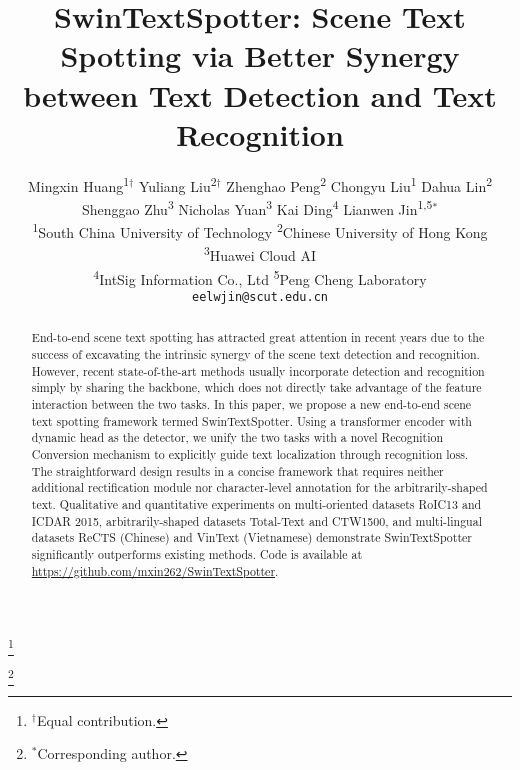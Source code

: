\documentclass[10pt,twocolumn,letterpaper]{article}
\newcommand\blfootnote[1]{\begingroup
\renewcommand\thefootnote{}\footnote{#1}\addtocounter{footnote}{-1}\endgroup
}
\begin{document}
\title{
SwinTextSpotter: Scene Text Spotting via Better Synergy between Text Detection and Text Recognition
}

\author{
Mingxin Huang\textsuperscript{1}$^\dag$
\quad Yuliang Liu\textsuperscript{2}$^\dag$
\quad Zhenghao Peng\textsuperscript{2}
\quad Chongyu Liu\textsuperscript{1}
\quad Dahua Lin\textsuperscript{2} 
\\
\quad Shenggao Zhu\textsuperscript{3}
\quad Nicholas Yuan\textsuperscript{3}
\quad Kai Ding\textsuperscript{4}
\quad Lianwen Jin\textsuperscript{1,5}$^*$
\\
\textsuperscript{1}{South China University of Technology} 
\quad \textsuperscript{2}{Chinese University of Hong Kong}
\quad \textsuperscript{3}{Huawei Cloud AI}
\\
\quad \textsuperscript{4}{IntSig Information Co., Ltd}
\quad \textsuperscript{5}{Peng Cheng Laboratory}
\\
{\tt\small eelwjin@scut.edu.cn}
}

\maketitle

\begin{abstract}

End-to-end scene text spotting has attracted great attention in recent years due to the success of excavating the intrinsic synergy of the scene text detection and recognition. However, recent state-of-the-art methods usually incorporate detection and recognition simply by sharing the backbone, which does not directly take advantage of the feature interaction between the two tasks.
In this paper, we propose a new end-to-end scene text spotting framework termed SwinTextSpotter.
Using a transformer encoder with dynamic head as the detector, we unify the two tasks with a novel Recognition Conversion mechanism to explicitly guide text localization through recognition loss.
The straightforward design results in a concise framework that requires neither additional rectification module nor character-level annotation for the arbitrarily-shaped text. 
Qualitative and quantitative experiments on multi-oriented datasets RoIC13 and ICDAR 2015, arbitrarily-shaped datasets Total-Text and CTW1500, and multi-lingual datasets ReCTS (Chinese) and VinText (Vietnamese) demonstrate SwinTextSpotter significantly outperforms existing methods. Code is available at \url{https://github.com/mxin262/SwinTextSpotter}.

\end{abstract}
\blfootnote{$^\dag$Equal contribution.}
\blfootnote{$^*$Corresponding author.}
\end{document}

